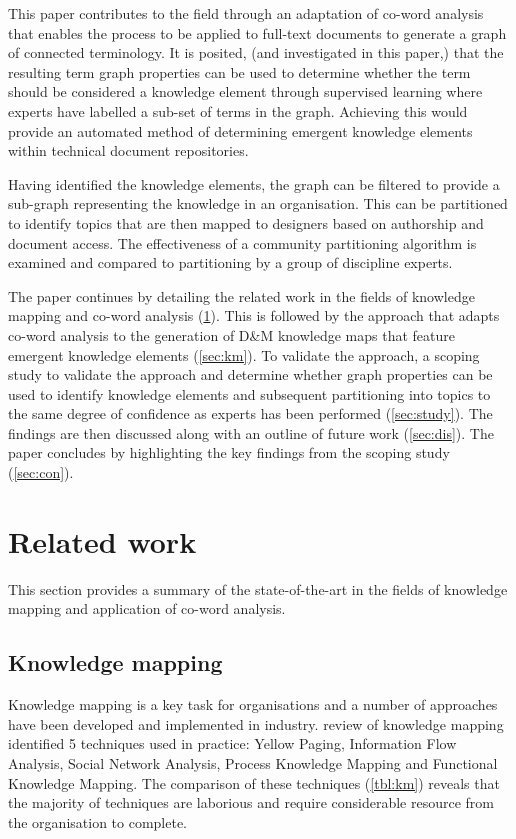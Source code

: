 \documentclass[a4paper, 11pt]{article}
\begin{document}
This paper contributes to the field through an adaptation of co-word analysis that enables the process to be applied to full-text documents to generate a graph of connected terminology.
It is posited, (and investigated in this paper,) that the resulting term graph properties can be used to determine whether the term should be considered a knowledge element through supervised learning where experts have labelled a sub-set of terms in the graph.
Achieving this would provide an automated method of determining emergent knowledge elements within technical document repositories.

Having identified the knowledge elements, the graph can be filtered to provide a sub-graph representing the knowledge in an organisation.
This can be partitioned to identify topics that are then mapped to designers based on authorship and document access.
The effectiveness of a community partitioning algorithm is examined and compared to partitioning by a group of discipline experts.

The paper continues by detailing the related work in the fields of knowledge mapping and co-word analysis (\cref{sec:rel}).
This is followed by the approach that adapts co-word analysis to the generation of D\&M knowledge maps that feature emergent knowledge elements (\cref{sec:km}).
To validate the approach, a scoping study to validate the approach and determine whether graph properties can be used to identify knowledge elements and subsequent partitioning into topics to the same degree of confidence as experts has been performed (\cref{sec:study}).
The findings are then discussed along with an outline of future work (\cref{sec:dis}). The paper concludes by highlighting the key findings from the scoping study (\cref{sec:con}).


\section{Related work}\label{sec:rel}

This section provides a summary of the state-of-the-art in the fields of knowledge mapping and application of co-word analysis.

\subsection{Knowledge mapping}

Knowledge mapping is a key task for organisations and a number of approaches have been developed and implemented in industry.
\textcite{jafari2009} review of knowledge mapping identified 5 techniques used in practice: Yellow Paging, Information Flow Analysis, Social Network Analysis, Process Knowledge Mapping and Functional Knowledge Mapping.
The comparison of these techniques (\cref{tbl:km}) reveals that the majority of techniques are laborious and require considerable resource from the organisation to complete.
\end{document}
